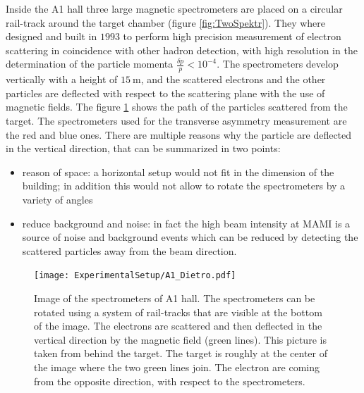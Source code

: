 Inside the A1 hall three large magnetic spectrometers are placed on a circular rail-track around the target chamber (figure \ref{fig:TwoSpektr}). They where designed and built in $1993$ to perform high precision measurement of electron scattering in coincidence with other hadron detection, with high resolution in the determination of the particle momenta $\frac{\delta p}{p} < 10^{-4}$. The spectrometers develop vertically with a height of $\SI{15}{\meter}$, and the scattered electrons and the other particles are deflected with respect to the scattering plane with the use of magnetic fields. The figure \ref{fig:TwoDetectors} shows the path of the particles scattered from the target. The spectrometers used for the transverse asymmetry measurement are the red and blue ones. There are multiple reasons why the particle are deflected in the vertical direction, that can be summarized in two points: 

\begin{itemize}
\item reason of space: a horizontal setup would not fit in the dimension of the building; in addition this would not allow to rotate the spectrometers by a variety of angles
\item reduce background and noise: in fact the high beam intensity at MAMI is a source of noise and background events which can be reduced by detecting the scattered particles away from the beam direction.
\end{itemize}    

\begin{figure}
\centering
\caption{Image of the spectrometers of A1 hall. The spectrometers can be rotated using a system of rail-tracks that are visible at the bottom of the image. The electrons are scattered and then deflected in the vertical direction by the magnetic field (green lines). This picture is taken from behind the target. The target is roughly at the center of the image where the two green lines join. The electron are coming from the opposite direction, with respect to the spectrometers.}\label{fig:TwoDetectors}
\texttt{[image: ExperimentalSetup/A1\_Dietro.pdf]}
\end{figure}
  
